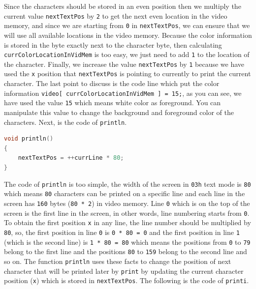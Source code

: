 Since the characters should be stored in an even position then we
multiply the current value \lstinline!nextTextPos! by \lstinline!2! to
get the next even location in the video memory, and since we are
starting from \lstinline!0! in \lstinline!nextTextPos!, we can ensure
that we will use all available locations in the video memory. Because
the color information is stored in the byte exactly next to the
character byte, then calculating \lstinline!currColorLocationInVidMem!
is too easy, we just need to add \lstinline!1! to the location of the
character. Finally, we increase the value \lstinline!nextTextPos! by
\lstinline!1! because we have used the \lstinline!x! position that
\lstinline!nextTextPos! is pointing to currently to print the current
character. The last point to discuss is the code line which put the
color information \lstinline!video[ currColorLocationInVidMem ] = 15;!,
as you can see, we have used the value \lstinline!15! which means white
color as foreground. You can manipulate this value to change the
background and foreground color of the characters. Next, is the code of
\lstinline!println!.

\begin{lstlisting}[language=C]
void println()
{
    nextTextPos = ++currLine * 80;
}
\end{lstlisting}

The code of \lstinline!println! is too simple, the width of the screen
in \lstinline!03h! text mode is \lstinline!80! which means
\lstinline!80! characters can be printed on a specific line and each
line in the screen has \lstinline!160! bytes (\lstinline!80 * 2!) in
video memory. Line \lstinline!0! which is on the top of the screen is
the first line in the screen, in other words, line numbering starts from
\lstinline!0!. To obtain the first position \lstinline!x! in any line,
the line number should be multiplied by \lstinline!80!, so, the first
position in line \lstinline!0! is \lstinline!0 * 80 = 0! and the first
position in line \lstinline!1! (which is the second line) is
\lstinline!1 * 80 = 80! which means the positions from \lstinline!0! to
\lstinline!79! belong to the first line and the positions \lstinline!80!
to \lstinline!159! belong to the second line and so on. The function
\lstinline!println! uses these facts to change the position of next
character that will be printed later by \lstinline!print! by updating
the current character position (\lstinline!x!) which is stored in
\lstinline!nextTextPos!. The following is the code of
\lstinline!printi!.


